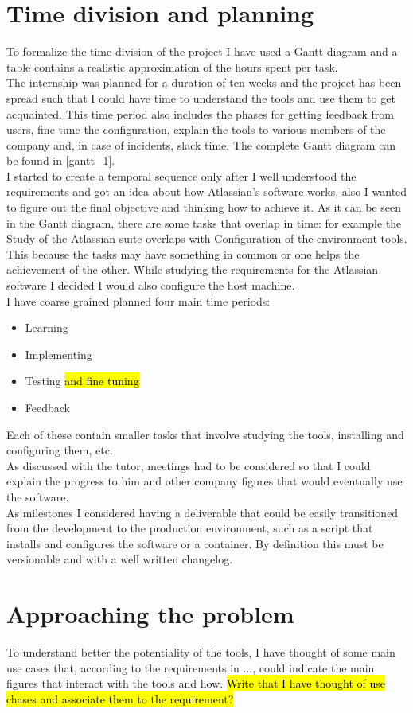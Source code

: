 \section{Time division and planning}
	To formalize the time division of the project I have used a Gantt diagram and a table contains a realistic approximation of the hours spent per task.\\
	The internship was planned for a duration of ten weeks and the project has been spread such that I could have time to understand the tools and use them to get acquainted.
	This time period also includes the phases for getting feedback from users, fine tune the configuration, explain the tools to various members of the company and, in case of incidents, slack time.
	The complete Gantt diagram can be found in \ref{gantt_1}.\\
	I started to create a temporal sequence only after I well understood the requirements and got an idea about how Atlassian's software works, also I wanted to figure out the final objective and thinking how to achieve it.
	As it can be seen in the Gantt diagram, there are some tasks that overlap in time: for example the Study of the Atlassian suite overlaps with Configuration of the environment tools.
	This because the tasks may have something in common or one helps the achievement of the other.
	While studying the requirements for the Atlassian software I decided I would also configure the host machine.\\
	I have coarse grained planned four main time periods:
	\begin{itemize}
		\item Learning
		\item Implementing
		\item Testing \hl{and fine tuning}
		\item Feedback
	\end{itemize}
	Each of these contain smaller tasks that involve studying the tools, installing and configuring them, etc.\\
	As discussed with the tutor, meetings had to be considered so that I could explain the progress to him and other company figures that would eventually use the software.\\
	As milestones I considered having a deliverable that could be easily transitioned from the development to the production environment, such as a script that installs and configures the software or a container.
	By definition this must be versionable and with a well written changelog.
	
\section{Approaching the problem}
	To understand better the potentiality of the tools, I have thought of some main use cases that, according to the requirements in ..., could indicate the main figures that interact with the tools and how.
	\hl{Write that I have thought of use chases and associate them to the requirement?}

	
	